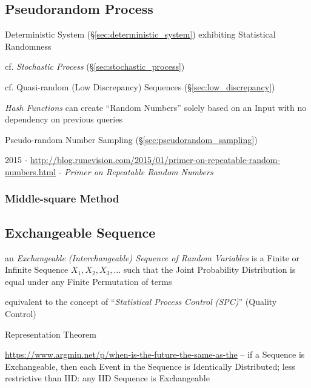 \subsection{Pseudorandom Process}\label{sec:pseudorandom_process}

Deterministic System (\S\ref{sec:deterministic_system}) exhibiting Statistical
Randomness

cf. \emph{Stochastic Process} (\S\ref{sec:stochastic_process})

cf. Quasi-random (Low Discrepancy) Sequences (\S\ref{sec:low_discrepancy})

\emph{Hash Functions} can create ``Random Numbers'' solely based on an Input
with no dependency on previous queries

\fist Pseudo-random Number Sampling (\S\ref{sec:pseudorandom_sampling})

2015 -
\url{http://blog.runevision.com/2015/01/primer-on-repeatable-random-numbers.html}
- \emph{Primer on Repeatable Random Numbers}



\subsubsection{Middle-square Method}\label{sec:middle_square_method}



\subsection{Exchangeable Sequence}\label{sec:exchangeable_sequence}

an \emph{Exchangeable (Interchangeable) Sequence of Random Variables} is a
Finite or Infinite Sequence $X_1, X_2, X_3, \ldots$ such that the Joint
Probability Distribution is equal under any Finite Permutation of terms

equivalent to the concept of ``\emph{Statistical Process Control (SPC)}''
(Quality Control)

Representation Theorem

\url{https://www.argmin.net/p/when-is-the-future-the-same-as-the} -- if a
Sequence is Exchangeable, then each Event in the Sequence is Identically
Distributed; less restrictive than IID: any IID Sequence is Exchangeable



